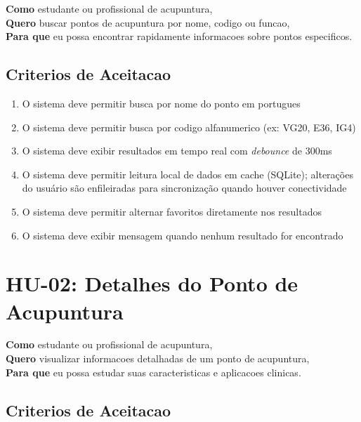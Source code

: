 \begin{apendicesenv}
\textbf{Como} estudante ou profissional de acupuntura, \\
\textbf{Quero} buscar pontos de acupuntura por nome, codigo ou funcao, \\
\textbf{Para que} eu possa encontrar rapidamente informacoes sobre pontos especificos.

\subsection*{Criterios de Aceitacao}

\begin{enumerate}
    \item O sistema deve permitir busca por nome do ponto em portugues
    \item O sistema deve permitir busca por codigo alfanumerico (ex: VG20, E36, IG4)
    \item O sistema deve exibir resultados em tempo real com \textit{debounce} de 300ms
    \item O sistema deve permitir leitura local de dados em cache (SQLite); alterações do usuário são enfileiradas para sincronização quando houver conectividade
    \item O sistema deve permitir alternar favoritos diretamente nos resultados
    \item O sistema deve exibir mensagem quando nenhum resultado for encontrado
\end{enumerate}


\section{HU-02: Detalhes do Ponto de Acupuntura}
\label{hu:detalhes}

\textbf{Como} estudante ou profissional de acupuntura, \\
\textbf{Quero} visualizar informacoes detalhadas de um ponto de acupuntura, \\
\textbf{Para que} eu possa estudar suas caracteristicas e aplicacoes clinicas.

\subsection*{Criterios de Aceitacao}


\end{apendicesenv}
